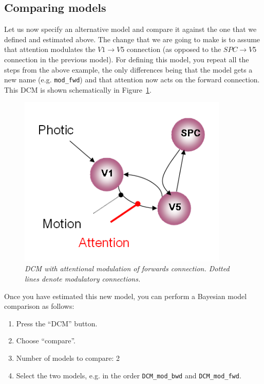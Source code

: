 \subsection{Comparing models}

Let us now specify an alternative model and compare it against the one that we defined and estimated above. The change that we are going to make is to assume that attention modulates the $V1 \rightarrow V5$ connection (as opposed to the $SPC \rightarrow V5$ connection in the previous model). For defining this model, you repeat all the steps from the above example, the only differences being that the model gets a new name (e.g. \verb!mod_fwd!) and that attention now acts on the forward connection. This DCM is shown schematically in Figure~\ref{fwd}.
\begin{figure}[ht]
\begin{center}
\includegraphics[width=100mm]{dcm/dcm_mod_fwd}
\caption{\em DCM with attentional modulation of forwards connection. Dotted lines denote modulatory connections.\label{fwd}}
\end{center}
\end{figure}
Once you have estimated this new model, you can perform a Bayesian model comparison as follows:
\begin{enumerate}
\item{Press the ``DCM'' button.}
\item{Choose ``compare''.}
\item{Number of models to compare: 2}
\item{Select the two models, e.g. in the order \verb!DCM_mod_bwd! and \verb!DCM_mod_fwd!.}
\end{enumerate}


